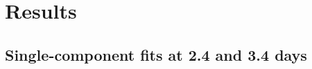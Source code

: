 \documentclass[twocolumn, twocolappendix]{aastex63}
\newcommand\redbf[1]{\textbf{\textcolor{red}{#1}}}
\begin{document}

\section{Results}\label{sec:results}


\subsection{Single-component fits at 2.4 and 3.4 days}\label{ssc:2.4_3.4_fits}


    
    
    

\end{document}
